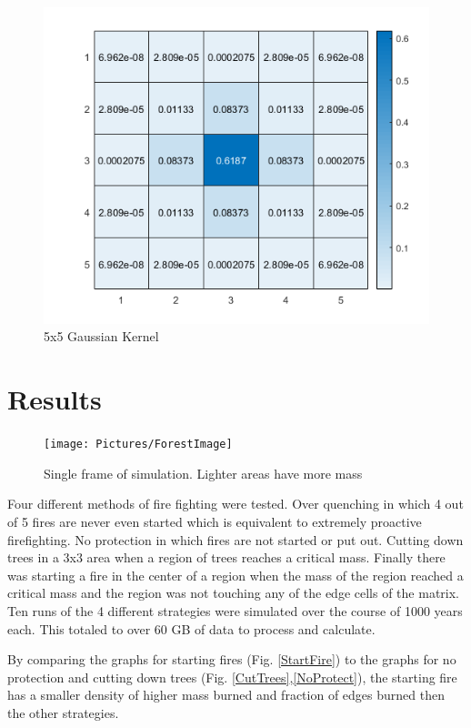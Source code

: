 \documentclass[ aps, pra, reprint, notitlepage ]{revtex4-1}
\begin{document}
\begin{figure}[ht]
	\includegraphics[scale=0.7]{Pictures/Guassian}
	\caption{\label{GuassDist} 5x5 Gaussian Kernel}
\end{figure}	

\section{\label{Results}Results}

\begin{figure}[ht]
	\texttt{[image: Pictures/ForestImage]}
	\caption{\label{SimulationSlice} Single frame of simulation. Lighter areas have more mass}
\end{figure}

Four different methods of fire fighting were tested. Over quenching in which 4 out of 5 fires are never even started which is equivalent to extremely proactive firefighting. No protection in which fires are not started or put out. Cutting down trees in a 3x3 area when a region of trees reaches a critical mass. Finally there was starting a fire in the center of a region when the mass of the region reached a critical mass and the region was not touching any of the edge cells of the matrix. Ten runs of the 4 different strategies were simulated over the course of 1000 years each. This totaled to over 60 GB of data to process and calculate.

By comparing the graphs for starting fires (Fig. \ref{StartFire}) to the graphs for no protection and cutting down trees (Fig. \ref{CutTrees},\ref{NoProtect}), the starting fire has a smaller density of higher mass burned and fraction of edges burned then the other strategies.
\end{document}
